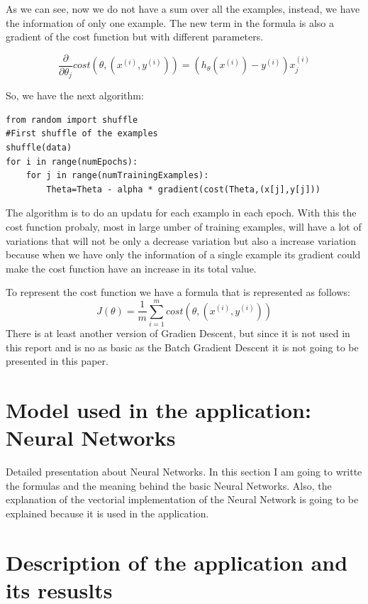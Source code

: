 \documentclass[12pt]{article}
\begin{document}
As we can see, now we do not have a sum over all the examples, instead, we have the information of only one example. The new term in the formula is also a gradient of the cost function but with different parameters.

\begin{equation}
 \frac{\partial}{\partial\theta_{j}}cost(\theta,(x^{(i)},y^{(i)}))= (h_{\theta}(x^{(i)})-y^{(i)})x_{j}^{(i)}
\end{equation}

So, we have the next algorithm:
\begin{lstlisting}
from random import shuffle
#First shuffle of the examples
shuffle(data)
for i in range(numEpochs):
	for j in range(numTrainingExamples):
		Theta=Theta - alpha * gradient(cost(Theta,(x[j],y[j]))
\end{lstlisting}

The algorithm is to do an updatu for each examplo in each epoch. With this the cost function probaly, most in large umber of training examples, will have a lot of variations that will not be only a decrease variation but also a increase variation because when we have only the information of a single example its gradient could make the cost function have an increase in its total value.

To represent the cost function we have a formula that is represented as follows:
\begin{equation}
  J(\theta)=\frac{1}{m} \displaystyle\sum_{i=1}^{m}cost(\theta,(x^{(i)},y^{(i)}))
\end{equation}
There is at least another version of Gradien Descent, but since it is not used in this report and is no as basic as the Batch Gradient Descent it is not going to be presented in this paper.

\section{Model used in the application: Neural Networks}
Detailed presentation about Neural Networks. In this section I am going to writte the formulas and the meaning behind the basic Neural Networks. Also, the explanation of the vectorial implementation of the Neural Network is going to be explained because it is used in the application.

\section{Description of the application and its resuslts}
\end{document}
